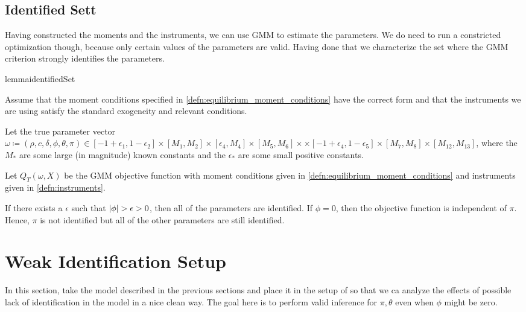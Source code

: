 \documentclass[11pt, letterpaper, twoside, final]{article}
\begin{document}
\subsection{Identified Sett}\label{sec:identified_set}

Having constructed the moments and the instruments, we can use GMM to estimate the parameters.
We do need to run a constricted optimization though, because only certain values of the parameters are valid. 
Having done that we characterize the set where the GMM criterion strongly identifies the parameters.

\begin{restatable}{lemma}{identifiedSet}

    Assume that the moment conditions specified in \cref{defn:equilibrium_moment_conditions} have the correct form
    and that the instruments we are using satisfy the standard exogeneity and relevant conditions. 

    Let the true parameter vector $\omega \coloneqq (\rho, c, \delta, \phi, \theta, \pi) \in [-1+\epsilon_1,
    1 - \epsilon_2] \times [M_1, M_2] \times [\epsilon_4, M_4]\times [M_5, M_6]\times \times [-1 +
    \epsilon_4, 1 - \epsilon_5] \times [M_7, M_8] \times [M_12, M_13]$, where the $M_{\ast}$ are some large (in
    magnitude) known constants and the $\epsilon_{\ast}$ are some small positive constants.  

    Let $Q_T(\omega, X)$  be the GMM objective function with moment conditions given in
    \cref{defn:equilibrium_moment_conditions} and instruments given in  \cref{defn:instruments}.

    If there exists a $\epsilon$ such that $\lvert\phi\rvert > \epsilon > 0$, then all of the parameters are identified. 
    If $\phi = 0$, then the objective function is independent of $\pi$. 
    Hence, $\pi$ is not identified but all of the other parameters are still identified.

\end{restatable}



\section{Weak Identification Setup}

In this section, take the model described in the previous sections and place it in the setup of
\textcite{andrews2014Gmm} so that we ca analyze the effects of possible lack of identification in the model in a
nice clean way.
The goal here is to perform valid inference for $\pi, \theta$ even when $\phi$ might be zero. 
\end{document}
